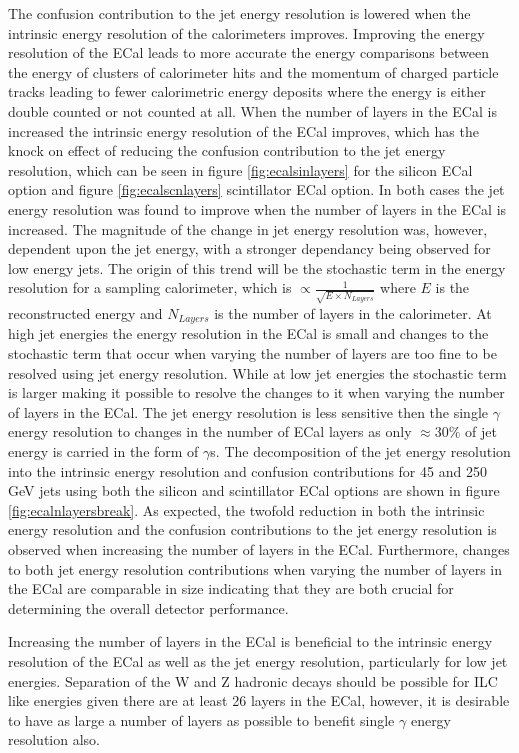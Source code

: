 The confusion contribution to the jet energy resolution is lowered when the intrinsic energy resolution of the calorimeters improves.  Improving the energy resolution of the ECal leads to more accurate the energy comparisons between the energy of clusters of calorimeter hits and the momentum of charged particle tracks leading to fewer calorimetric energy deposits where the energy is either double counted or not counted at all.  When the number of layers in the ECal is increased the intrinsic energy resolution of the ECal improves, which has the knock on effect of reducing the confusion contribution to the jet energy resolution, which can be seen in figure \ref{fig:ecalsinlayers} for the silicon ECal option and figure \ref{fig:ecalscnlayers} scintillator ECal option.  In both cases the jet energy resolution was found to improve when the number of layers in the ECal is increased.  The magnitude of the change in jet energy resolution was, however, dependent upon the jet energy, with a stronger dependancy being observed for low energy jets.  The origin of this trend will be the stochastic term in the energy resolution for a sampling calorimeter, which is $\propto \frac{1}{\sqrt{E \times N_{Layers}}}$ where $E$ is the reconstructed energy and $N_{Layers}$ is the number of layers in the calorimeter.  At high jet energies the energy resolution in the ECal is small and changes to the stochastic term that occur when varying the number of layers are too fine to be resolved using jet energy resolution.  While at low jet energies the stochastic term is larger making it possible to resolve the changes to it when varying the number of layers in the ECal.  The jet energy resolution is less sensitive then the single $\gamma$ energy resolution to changes in the number of ECal layers as only $\approx 30\%$ of jet energy is carried in the form of $\gamma$s.  The decomposition of the jet energy resolution into the intrinsic energy resolution and confusion contributions for 45 and 250 GeV jets using both the silicon and scintillator ECal options are shown in figure \ref{fig:ecalnlayersbreak}.  As expected, the twofold reduction in both the intrinsic energy resolution and the confusion contributions to the jet energy resolution is observed when increasing the number of layers in the ECal.  Furthermore, changes to both jet energy resolution contributions when varying the number of layers in the ECal are comparable in size indicating that they are both crucial for determining the overall detector performance.  

Increasing the number of layers in the ECal is beneficial to the intrinsic energy resolution of the ECal as well as the jet energy resolution, particularly for low jet energies.  Separation of the W and Z hadronic decays should be possible for ILC like energies given there are at least 26 layers in the ECal, however, it is desirable to have as large a number of layers as possible to benefit single $\gamma$ energy resolution also.  

